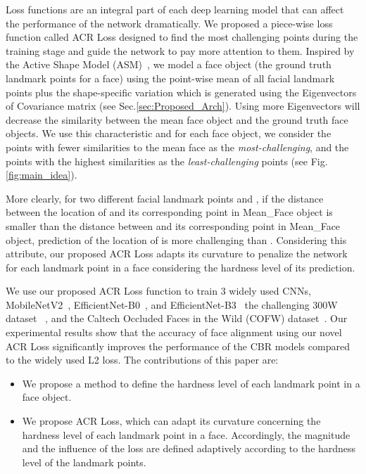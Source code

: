 \documentclass[a4paper,conference]{IEEEtran}
\begin{document}
Loss functions are an integral part of each deep learning model that can affect the performance of the network dramatically. We proposed a piece-wise loss function called ACR Loss designed to find the most challenging points during the training stage and guide the network to pay more attention to them. Inspired by the Active Shape Model (ASM)~\cite{ordas2003active}, we model a face object (the ground truth landmark points for a face) using the point-wise mean of all facial landmark points plus the shape-specific variation which is generated using the Eigenvectors of Covariance matrix (see Sec.\ref{sec:Proposed_Arch}). Using more Eigenvectors will decrease the similarity between the mean face object and the ground truth face objects.
We use this characteristic and for each face object, we consider the points with fewer similarities to the mean face as the \textit{most-challenging}, and the points with the highest similarities as the \textit{least-challenging} points (see Fig.\ref{fig:main_idea}).

More clearly, for two different facial landmark points  and , if the distance between the location of  and its corresponding point in Mean\_Face object is smaller than the distance between  and its corresponding point in Mean\_Face object, prediction of the location of  is more challenging than . Considering this attribute, our proposed ACR Loss adapts its curvature to penalize the network for each landmark point in a face considering the hardness level of its prediction. 


We use our proposed ACR Loss function to train 3 widely used CNNs, MobileNetV2~\cite{sandler2018mobilenetv2}, EfficientNet-B0~\cite{tan2020efficientnet}, and EfficientNet-B3~\cite{tan2020efficientnet} the challenging 300W dataset ~\cite{sagonas2013300}, and the Caltech Occluded Faces in the Wild (COFW) dataset~\cite{burgos2013robust}. Our experimental results show that the accuracy of face alignment using our novel ACR Loss significantly improves the performance of the CBR models compared to the widely used L2 loss. The contributions of this paper are:
\begin{itemize}
\item We propose a method to define the hardness level of each landmark point in a face object.
\item We propose ACR Loss, which can adapt its curvature concerning the hardness level of each landmark point in a face. Accordingly, the magnitude and the influence of the loss are defined adaptively according to the hardness level of the landmark points.
\end{itemize}
\end{document}

